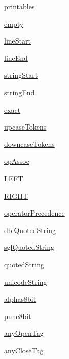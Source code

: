 \begin{DoxyCompactItemize}
\item 
\hyperlink{namespacepyparsing_ad8c4f09cc517099e759be4c94403f9b4}{printables}
\item 
\hyperlink{namespacepyparsing_af77587cc29467c9ee7feb01c8cc71445}{empty}
\item 
\hyperlink{namespacepyparsing_a2b04510cc30ccec2e272684c835b4d0c}{line\+Start}
\item 
\hyperlink{namespacepyparsing_a042457c4400ee7d4cbc47498d08a7373}{line\+End}
\item 
\hyperlink{namespacepyparsing_a67f47d95cd52b3975fe581d9a7f8ab29}{string\+Start}
\item 
\hyperlink{namespacepyparsing_a703772e5be771c9f8d299cbffaf84a5c}{string\+End}
\item 
\hyperlink{namespacepyparsing_a832e22d9e8c149774782b6f58d10278f}{exact}
\item 
\hyperlink{namespacepyparsing_a87da767bd1f40e1004abf38d62e37162}{upcase\+Tokens}
\item 
\hyperlink{namespacepyparsing_ae22271fdc1f1b5617ad49da27880d980}{downcase\+Tokens}
\item 
\hyperlink{namespacepyparsing_a2c8744b10e3c348dea440d54cae878d5}{op\+Assoc}
\item 
\hyperlink{namespacepyparsing_a4483dde0dd5ecb74c34ae9a7af941236}{L\+E\+FT}
\item 
\hyperlink{namespacepyparsing_a76212e2a2b806de1ea2565168c9f68d8}{R\+I\+G\+HT}
\item 
\hyperlink{namespacepyparsing_a87d6136009560b41a09d42269b7982d8}{operator\+Precedence}
\item 
\hyperlink{namespacepyparsing_ab8f938666ea40119a8419a8cabca3eee}{dbl\+Quoted\+String}
\item 
\hyperlink{namespacepyparsing_a1c5f0ce91e25d989ae22e23242e98f3a}{sgl\+Quoted\+String}
\item 
\hyperlink{namespacepyparsing_ae8adf871b3e4f03a1f441f0616841ef2}{quoted\+String}
\item 
\hyperlink{namespacepyparsing_a63ab3f5b3ec40c82f883f2b187a4059a}{unicode\+String}
\item 
\hyperlink{namespacepyparsing_af6acfb83e599b4f2faf002a272701618}{alphas8bit}
\item 
\hyperlink{namespacepyparsing_aa6f0bafa554b716a30eacdc87bc2b127}{punc8bit}
\item 
\hyperlink{namespacepyparsing_a4aae3dfc90ea1f18670821f07458e9cb}{any\+Open\+Tag}
\item 
\hyperlink{namespacepyparsing_a4d942e48b9a8f74387a2fc26b3f7ad9a}{any\+Close\+Tag}

\end{DoxyCompactItemize}
